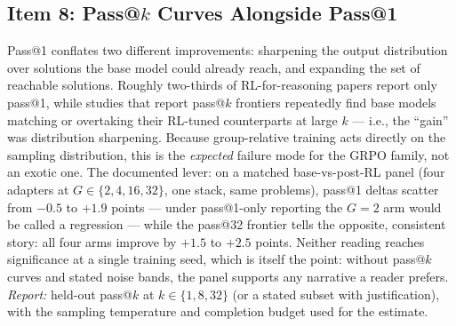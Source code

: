 \documentclass{article}  \usepackage[preprint,nonatbib]{neurips_2026} \usepackage[numbers]{natbib}
\begin{document}
\subsection{Item 8: Pass@$k$ Curves Alongside Pass@1}
\label{sec:p5-item8}
Pass@1 conflates two different improvements: sharpening the output
distribution over solutions the base model could already reach, and
expanding the set of reachable solutions. Roughly two-thirds of
RL-for-reasoning papers report only pass@1, while studies that report
pass@$k$ frontiers repeatedly find base models matching or overtaking
their RL-tuned counterparts at large $k$ --- i.e., the ``gain'' was
distribution sharpening. Because group-relative training acts directly on
the sampling distribution, this is the \emph{expected} failure mode for
the GRPO family, not an exotic one. The documented lever: on a matched
base-vs-post-RL panel (four adapters at $G\in\{2,4,16,32\}$, one stack,
same problems), pass@1 deltas scatter from $-0.5$ to $+1.9$ points ---
under pass@1-only reporting the $G{=}2$ arm would be called a regression
--- while the pass@32 frontier tells the opposite, consistent story: all
four arms improve by $+1.5$ to $+2.5$ points. Neither reading reaches
significance at a single training seed, which is itself the point:
without pass@$k$ curves and stated noise bands, the panel supports any
narrative a reader prefers. \emph{Report:} held-out pass@$k$ at
$k \in \{1, 8, 32\}$ (or a stated subset with justification), with the
sampling temperature and completion budget used for the estimate.
\end{document}
